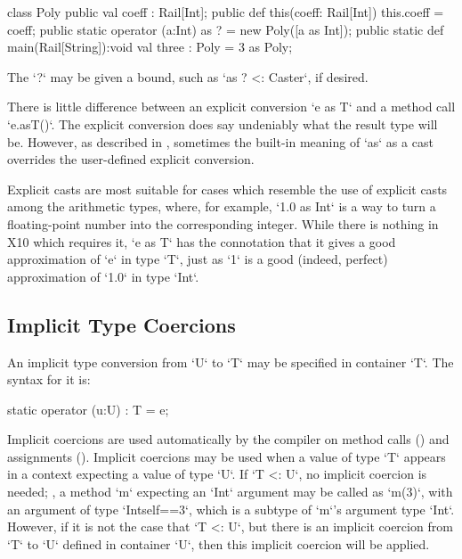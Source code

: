 \begin{ex}
\begin{xten}
class Poly {
  public val coeff : Rail[Int];
  public def this(coeff: Rail[Int]) { this.coeff = coeff;}
  public static operator (a:Int) as ? = new Poly([a as Int]);
  public static def main(Rail[String]):void {
     val three : Poly = 3 as Poly;
  }
}
\end{xten}
%
\end{ex}
The \xcd`?` may be given a bound, such as \xcd`as ? <: Caster`, if desired.
  

There is little difference between an explicit conversion \xcd`e as T` and a
method call \xcd`e.asT()`.  The explicit conversion does say undeniably what
the result type will be.  However, as described in ,
sometimes the built-in meaning of \xcd`as` as a cast overrides the
user-defined explicit conversion.  

Explicit casts are most suitable for cases
which resemble the use of explicit casts among the arithmetic types, where, 
for example, \xcd`1.0 as Int` is a way to turn a floating-point number into the
corresponding integer.  
While there is nothing in X10 which
requires it, \xcd`e as T` has the connotation that it gives a good
approximation of \xcd`e` in type \xcd`T`, just as \xcd`1` is a good
(indeed, perfect) approximation of \xcd`1.0` in type \xcd`Int`.  

\subsection{Implicit Type Coercions}
\label{sect:ImplicitCoercion}

An implicit type conversion from \xcd`U`  to \xcd`T` may be specified in
container \xcd`T`.  
The syntax for it is: 
\begin{xten}
static operator (u:U) : T = e;
\end{xten}



Implicit coercions are used automatically by the compiler on method calls 
() and assignments ().
Implicit coercions may be used when a value of type \xcd`T` appears in a
context expecting a value of type \xcd`U`.  If \xcd`T <: U`, no implicit
coercion is needed; \eg, a method \xcd`m` expecting an \xcd`Int` argument may 
be called as \xcd`m(3)`, with an argument of type \xcd`Int{self==3}`, which is
a subtype of \xcd`m`'s argument type \xcd`Int`. 
However, if it is not the case that \xcd`T <: U`, but there is an implicit
coercion from \xcd`T` to \xcd`U` defined in container \xcd`U`, then this
implicit coercion will be applied.


